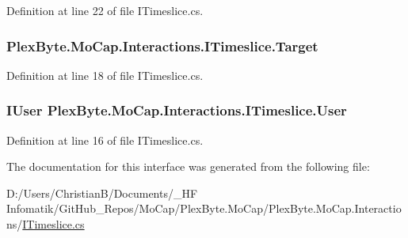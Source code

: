 Definition at line 22 of file I\+Timeslice.\+cs.

\subsubsection[{\texorpdfstring{Target}{Target}}]{ Plex\+Byte.\+Mo\+Cap.\+Interactions.\+I\+Timeslice.\+Target\hspace{0.3cm}{\ttfamily [get]}}\hypertarget{interface_plex_byte_1_1_mo_cap_1_1_interactions_1_1_i_timeslice_a1b70f9e866de9e39c2de1bc4db02d629}{}\label{interface_plex_byte_1_1_mo_cap_1_1_interactions_1_1_i_timeslice_a1b70f9e866de9e39c2de1bc4db02d629}


Definition at line 18 of file I\+Timeslice.\+cs.

\subsubsection[{\texorpdfstring{User}{User}}]{\setlength{\rightskip}{0pt plus 5cm}I\+User Plex\+Byte.\+Mo\+Cap.\+Interactions.\+I\+Timeslice.\+User\hspace{0.3cm}{\ttfamily [get]}}\hypertarget{interface_plex_byte_1_1_mo_cap_1_1_interactions_1_1_i_timeslice_a719ec23a47825e45f4106f1c50a08804}{}\label{interface_plex_byte_1_1_mo_cap_1_1_interactions_1_1_i_timeslice_a719ec23a47825e45f4106f1c50a08804}


Definition at line 16 of file I\+Timeslice.\+cs.



The documentation for this interface was generated from the following file\+:\begin{DoxyCompactItemize}
\item 
D\+:/\+Users/\+Christian\+B/\+Documents/\+\_\+\+H\+F Infomatik/\+Git\+Hub\+\_\+\+Repos/\+Mo\+Cap/\+Plex\+Byte.\+Mo\+Cap/\+Plex\+Byte.\+Mo\+Cap.\+Interactions/\hyperlink{_i_timeslice_8cs}{I\+Timeslice.\+cs}\end{DoxyCompactItemize}
